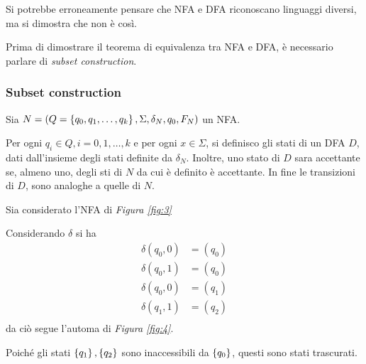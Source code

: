 \documentclass{subfiles}
\begin{document}
Si potrebbe erroneamente pensare che NFA e DFA riconoscano linguaggi diversi, ma si dimostra che non è così.

\noindent Prima di dimostrare il teorema di equivalenza tra NFA e DFA, è necessario parlare di \emph{subset construction}.

\subsubsection{Subset construction}
Sia \(N = (Q = \left\{q_{0}, q_{1}, \ldots, q_{k}\right\}, \Sigma, \delta_{N}, q_{0}, F_{N})\) un NFA.

\noindent Per ogni \(q_{i} \in Q, i = 0, 1, \ldots, k\) e per ogni \(x \in \Sigma\), si definisco gli stati di un DFA \(D\),
dati dall'insieme degli stati definite da \(\delta_{N}\).
Inoltre, uno stato di \(D\) sara accettante se, almeno uno, degli sti di \(N\) da cui è definito è accettante.
In fine le transizioni di \(D\), sono analoghe a quelle di \(N\).

\begin{Example*}
    Sia considerato l'NFA di \emph{Figura \eqref{fig:3}}
    

    \noindent Considerando \(\delta\) si ha
    \[\begin{aligned}
            \delta(q_{0}, 0) & = (q_{0}) \\
            \delta(q_{0}, 1) & = (q_{0}) \\
            \delta(q_{0}, 0) & = (q_{1}) \\
            \delta(q_{1}, 1) & = (q_{2}) \\
        \end{aligned}\]
    da ciò segue l'automa di \emph{Figura \eqref{fig:4}}.
    

    \noindent Poiché gli stati \(\left\{q_{1}\right\}, \left\{q_{2}\right\}\) sono inaccessibili da \(\left\{q_{0}\right\}\), questi sono stati trascurati.
\end{Example*}
\end{document}
